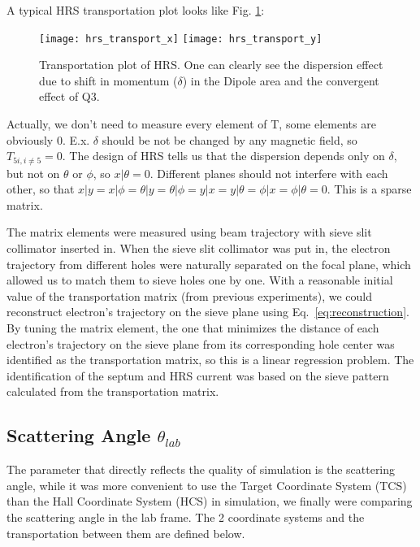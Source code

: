 A typical HRS transportation plot looks like Fig. \ref{fig:hrs_transport}:
\begin{figure}[H]
    \texttt{[image: hrs\_transport\_x]}
    \texttt{[image: hrs\_transport\_y]}
    \caption{Transportation plot of HRS. One can clearly see the dispersion effect
    due to shift in momentum ($\delta$) in the Dipole area and the convergent effect
    of Q3.}
    \label{fig:hrs_transport}
\end{figure}

Actually, we don't need to measure every element of T, some elements are obviously
0. E.x. $\delta$ should be not be changed by any magnetic field, so $T_{5i, i\ne 5} = 0$.
The design of HRS tells us that the dispersion depends only on $\delta$, but not
on $\theta$ or $\phi$, so $x|\theta = 0$. Different planes should not
interfere with each other, so that $x|y = x|\phi = \theta|y = \theta|\phi 
= y|x = y|\theta = \phi|x = \phi|\theta = 0$. This is a sparse matrix.

The matrix elements were measured using beam trajectory with sieve slit collimator
inserted in. When the sieve slit collimator was put in, the electron trajectory
from different holes were naturally separated on the focal plane, which allowed
us to match them to sieve holes one by one. With a reasonable initial value of 
the transportation matrix (from previous experiments),
we could reconstruct electron's trajectory on the sieve plane using Eq.~\ref{eq:reconstruction}.
By tuning the matrix element, the one that minimizes the distance of each electron's trajectory on the sieve
plane from its corresponding hole center was identified as the transportation
matrix, so this is a linear regression problem. The identification of the septum 
and HRS current was based on the sieve pattern calculated from the 
transportation matrix. 


\subsection{Scattering Angle $\theta_{lab}$}
The parameter that directly reflects the quality of simulation is the scattering
angle, while it was more convenient to use the Target Coordinate System (TCS) 
than the Hall Coordinate System (HCS) in simulation, we finally were comparing
the scattering angle in the lab frame. The 2 coordinate systems and the transportation
between them are defined below.

